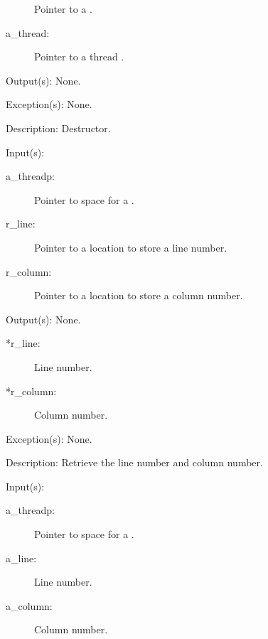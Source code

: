 \begin{capi}
\begin{capilist}
\begin{description}
			Pointer to a .
		\item[a\_thread: ]
			Pointer to a thread .
		\end{description}
	\item[Output(s): ] None.
	\item[Exception(s): ] None.
	\item[Description: ]
		Destructor.
	\end{capilist}
\label{nxo_threadp_position_get}
	\begin{capilist}
	\item[Input(s): ]
		\begin{description}\item[]
		\item[a\_threadp: ]
			Pointer to space for a .
		\item[r\_line: ]
			Pointer to a location to store a line number.
		\item[r\_column: ]
			Pointer to a location to store a column number.
		\end{description}
	\item[Output(s): ] None.
		\begin{description}\item[]
		\item[*r\_line: ]
			Line number.
		\item[*r\_column: ]
			Column number.
		\end{description}
	\item[Exception(s): ] None.
	\item[Description: ]
		Retrieve the line number and column number.
	\end{capilist}
\label{nxo_threadp_position_set}
	\begin{capilist}
	\item[Input(s): ]
		\begin{description}\item[]
		\item[a\_threadp: ]
			Pointer to space for a \classname{threadp}.
		\item[a\_line: ]
			Line number.
		\item[a\_column: ]
			Column number.

\end{description}
\end{capilist}
\end{capi}

